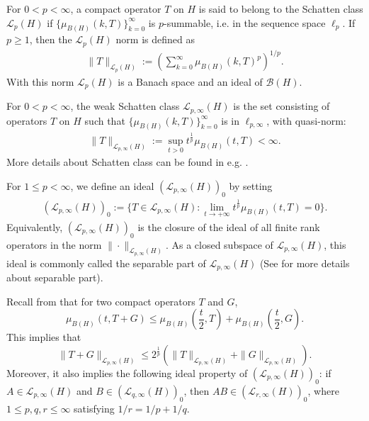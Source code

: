 \documentclass[12pt]{amsart}
\begin{document}
For $0<p<\infty$, a compact operator $T$ on $H$ is said to belong to the Schatten class $\mathcal{L}_{p}(H)$ if $\{\mu_{B(H)}(k,T)\}_{k=0}^{\infty}$ is $p$-summable, i.e. in the sequence space $\ell_{p}$. If $p\geq 1$, then the $\mathcal{L}_{p}(H)$ norm is defined as
\begin{align*}
\|T\|_{\mathcal{L}_{p}(H)}:=\left(\sum_{k=0}^{\infty}\mu_{B(H)}(k,T)^{p}\right)^{1/p}.
\end{align*}
With this norm $\mathcal{L}_p(H)$ is a Banach space and an ideal of $\mathcal{B}(H)$.

For $0<p<\infty$, the weak Schatten class $\mathcal{L}_{p,\infty}(H)$ is the set consisting of operators $T$ on $H$ such that $\{\mu_{B(H)}(k,T)\}_{k=0}^{\infty}$ is in $\ell_{p,\infty}$, with quasi-norm:
\begin{align*}
\|T\|_{\mathcal{L}_{p,\infty}(H)}:=\sup\limits_{t>0}t^{\frac 1p}\mu_{B(H)}(t,T)<\infty.
\end{align*}
More details about Schatten class can be found in e.g. \cite{LSZ1,LSZ2}.

For $1\leq p <\infty$, we define an ideal $(\mathcal{L}_{p,\infty}(H))_{0}$ by setting
\begin{align*}
(\mathcal{L}_{p,\infty}(H))_{0}:=\{T \in \mathcal{L}_{p,\infty}(H)   :  \lim_{t\to +\infty} t^{\frac 1p} \mu_{B(H)}(t,T) = 0 \}.
\end{align*}
Equivalently, $(\mathcal{L}_{p,\infty}(H))_{0}$ is the closure of the ideal of all finite rank operators in the norm $\|\cdot\|_{\mathcal{L}_{p,\infty}(H)}$.
As a closed subspace of $\mathcal{L}_{p,\infty}(H)$, this ideal is commonly called the separable part of $\mathcal{L}_{p,\infty}(H)$ (See \cite{LSZ1,LSZ2} for more details about separable part).

Recall from \cite[Corollary 2.3.16]{LSZ1} that for two compact operators $T$ and $G$,
$$\mu_{B(H)}(t,T+G)\leq \mu_{B(H)}(\frac t2,T)+\mu_{B(H)}(\frac t2,G).$$
This implies that
$$\|T+G\|_{\mathcal{L}_{p,\infty}(H)}\leq 2^{\frac1p}(\|T\|_{\mathcal{L}_{p,\infty}(H)}+\|G\|_{\mathcal{L}_{p,\infty}(H)}).$$
Moreover, it also implies the following ideal property of $(\mathcal{L}_{p,\infty}(H))_0$: if $A\in \mathcal{L}_{p,\infty}(H)$ and $B\in (\mathcal{L}_{q,\infty}(H))_0$, then $AB\in (\mathcal{L}_{r,\infty}(H))_{0}$, where $1\leq p,q,r\leq\infty$ satisfying $1/r=1/p+1/q$.
\end{document}
